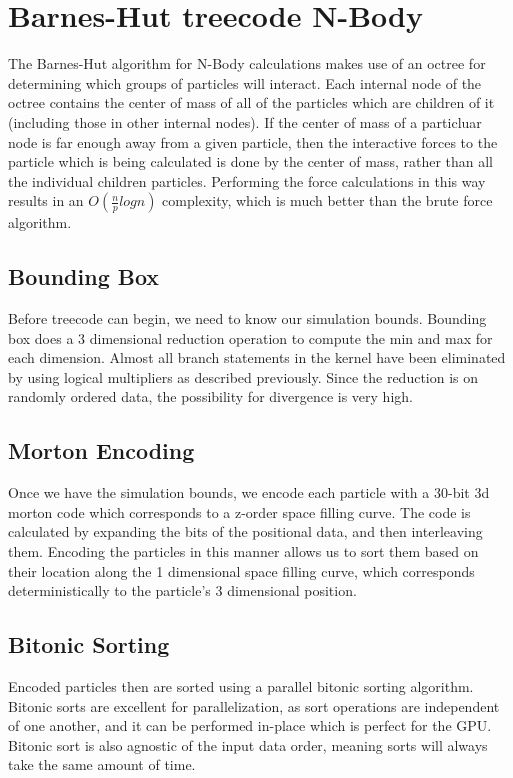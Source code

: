 \documentclass[fleqn,10pt]{SelfArx} %
\begin{document}
\section{Barnes-Hut treecode N-Body}
The Barnes-Hut algorithm for N-Body calculations makes use of an octree for determining which groups of particles will interact. Each internal node of the octree contains the center of mass of all of the particles which are children of it (including those in other internal nodes). If the center of mass of a particluar node is far enough away from a given particle, then the interactive forces to the particle which is being calculated is done by the center of mass, rather than all the individual children particles. Performing the force calculations in this way results in an $O(\frac{n}{p} log n)$ complexity, which is much better than the brute force algorithm.

\subsection{Bounding Box}
Before treecode can begin, we need to know our simulation bounds. Bounding box does a 3 dimensional reduction operation to compute the min and max for each dimension. Almost all branch statements in the kernel have been eliminated by using logical multipliers as described previously. Since the reduction is on randomly ordered data, the possibility for divergence is very high. 

\subsection{Morton Encoding}
Once we have the simulation bounds, we encode each particle with a 30-bit 3d morton code which corresponds to a z-order space filling curve. The code is calculated by expanding the bits of the positional data, and then interleaving them. Encoding the particles in this manner allows us to sort them based on their location along the 1 dimensional space filling curve, which corresponds deterministically to the particle’s 3 dimensional position.

\subsection{Bitonic Sorting}
Encoded particles then are sorted using a parallel bitonic sorting algorithm. Bitonic sorts are excellent for parallelization, as sort operations are independent of one another, and it can be performed in-place which is perfect for the GPU. Bitonic sort is also agnostic of the input data order, meaning sorts will always take the same amount of time.
\end{document}
